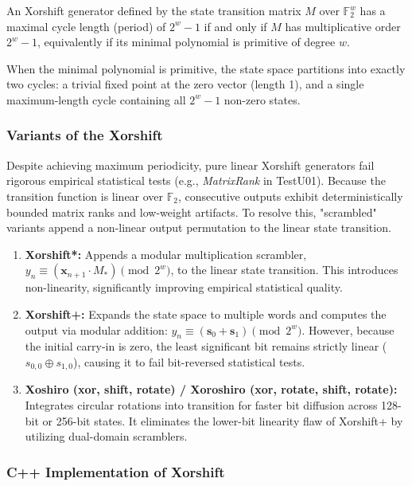 \begin{theorem}
An Xorshift generator defined by the state transition matrix $M$ over $\mathbb{F}_2^w$ has a maximal cycle length (period) of $2^w - 1$ if and only if $M$ has multiplicative order $2^w - 1$, equivalently if its minimal polynomial is primitive of degree $w$.
\end{theorem}
When the minimal polynomial is primitive, the state space partitions into exactly two cycles: a trivial fixed point at the zero vector (length 1), and a single maximum-length cycle containing all $2^w - 1$ non-zero states.

\subsubsection{Variants of the Xorshift}

Despite achieving maximum periodicity, pure linear Xorshift generators fail rigorous empirical statistical tests (e.g., \textit{MatrixRank} in TestU01). Because the transition function is linear over $\mathbb{F}_2$, consecutive outputs exhibit deterministically bounded matrix ranks and low-weight artifacts. To resolve this, "scrambled" variants append a non-linear output permutation to the linear state transition.


\begin{enumerate}
    \item \textbf{Xorshift*:} Appends a modular multiplication scrambler, $y_n \equiv (\mathbf{x}_{n+1} \cdot M_{\ast}) \pmod{2^w}$, to the linear state transition. This introduces non-linearity, significantly improving empirical statistical quality.

    \item \textbf{Xorshift+:} Expands the state space to multiple words and computes the output via modular addition: $y_n \equiv (\mathbf{s}_0 + \mathbf{s}_1) \pmod{2^w}$. However, because the initial carry-in is zero, the least significant bit remains strictly linear ($s_{0,0} \oplus s_{1,0}$), causing it to fail bit-reversed statistical tests.

    \item \textbf{Xoshiro (xor, shift, rotate) / Xoroshiro (xor, rotate, shift, rotate):} Integrates circular rotations into transition for faster bit diffusion across 128-bit or 256-bit states. It eliminates the lower-bit linearity flaw of Xorshift+ by utilizing dual-domain scramblers.
\end{enumerate}


\subsubsection{C++ Implementation of Xorshift}

